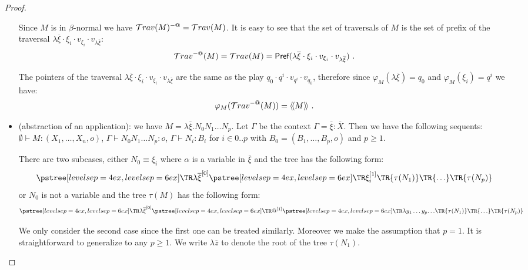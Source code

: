 \begin{proof}
\begin{itemize}
        Since $M$ is in $\beta$-normal we have $\mathcal{T}rav(M)^{-@} = \mathcal{T}rav(M)$.
        It is easy to see that the set of traversals of $M$ is the set of prefix of
        the traversal $\lambda \overline{\xi} \cdot \xi_i \cdot v_{\xi_i} \cdot v_{\lambda \overline{\xi}}$:
        $$ \mathcal{T}rav^{-@}(M) = \mathcal{T}rav(M) = \textsf{Pref}( \lambda \overline{\xi} \cdot \xi_i \cdot v_{\xi_i} \cdot v_{\lambda \overline{\xi}}) \ .
        $$

        The pointers of the traversal $\lambda \overline{\xi} \cdot \xi_i \cdot v_{\xi_i} \cdot
        v_{\lambda \overline{\xi}}$ are the same as the play $q_0 \cdot q^i \cdot v_{q^i} \cdot
        v_{q_0}$, therefore since $\varphi_M(\lambda \overline{\xi}) = q_0$ and $\varphi_M(\xi_i) =
        q^i$ we have:
        $$ \varphi_M(\travset^{-@}(M)) = \intersem{M}\ .$$


    \item (abstraction of an application): we have $M = \lambda \overline{\xi} . N_0 N_1 \ldots N_p$. Let $\Gamma$ be the context
    $\Gamma = \overline{\xi} : \overline{X}$. Then we have the following sequents:
    $\emptyset \vdash M : (X_1,\ldots,X_n,o)$,
    $\Gamma \vdash N_0 N_1 \ldots N_p : o$,
    $\Gamma \vdash N_i : B_i$ for $i\in 0..p$ with $B_0 = (B_1,\ldots,B_p,o)$ and $p\geq 1$.

    There are two subcases, either $N_0 \equiv \xi_i$ where $\alpha$ is a variable in $\overline{\xi}$ and the tree has the following form:
    $$ \tree[levelsep=6ex]{\lambda \overline{\xi}^{[0]}}
        { \tree[levelsep=6ex]{\xi_i^{[1]}}
            {   \TR{\tau(N_1)} \TR{\ldots} \TR{\tau(N_p)}}}
    $$
    or $N_0$ is not a variable and the tree $\tau(M)$ has the following form:
    $$ \tree[levelsep=6ex]{\lambda \overline{\xi}^{[0]}}
        { \tree[levelsep=6ex]{@^{[1]}}
            {
            \tree[levelsep=6ex]{\lambda y_1 \ldots y_p}{\ldots}
            \TR{\tau(N_1)} \TR{\ldots} \TR{\tau(N_p)}}}
    $$

    We only consider the second case since the first one can be treated
    similarly. Moreover we make the assumption that $p=1$. It is
    straightforward to generalize to any $p\geq1$.
    We write $\lambda \overline{z}$ to denote the root of the tree $\tau(N_1)$.



\end{itemize}
\end{proof}
